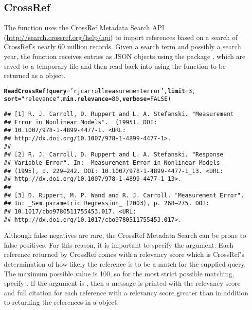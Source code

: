 \documentclass[article]{jss}\usepackage[]{graphicx}\usepackage[]{color}
\makeatletter
\newcommand{\hlnum}[1]{\textcolor[rgb]{0.125,0.125,1}{#1}}%
\newcommand{\hlstr}[1]{\textcolor[rgb]{0.125,0.125,1}{#1}}%
\newcommand{\hlstd}[1]{\textcolor[rgb]{0.251,0.251,0.282}{#1}}%
\newcommand{\hlkwc}[1]{\textcolor[rgb]{0.529,0,0.184}{\textbf{#1}}}%
\newcommand{\hlkwd}[1]{\textcolor[rgb]{0.251,0.251,0.282}{\textbf{#1}}}%
\newenvironment{kframe}{%
 \def\at@end@of@kframe{}%
 \ifinner\ifhmode%
  \def\at@end@of@kframe{\end{minipage}}%
  \begin{minipage}{\columnwidth}%
 \fi\fi%
 \def\FrameCommand##1{\hskip\@totalleftmargin \hskip-\fboxsep
 \colorbox{shadecolor}{##1}\hskip-\fboxsep
     \hskip-\linewidth \hskip-\@totalleftmargin \hskip\columnwidth}%
 \MakeFramed {\advance\hsize-\width
   \@totalleftmargin\z@ \linewidth\hsize
   \@setminipage}}%
 {\par\unskip\endMakeFramed%
 \at@end@of@kframe}
\newenvironment{knitrout}{}{} %
\makeatother
\begin{document}
\subsection{CrossRef}
The function  uses the CrossRef Metadata Search API (\url{http://search.crossref.org/help/api}) to import references based on a search of CrossRef's nearly 60 million records.  Given a search term and possibly a search year, the function receives \Bibtex{} entries as JSON objects using the  package \citep{RJSONIO}, which are saved to a temporary file and then read back into \R{} using the  function to be returned as a  object.
\begin{knitrout}
\color{fgcolor}\begin{kframe}
\begin{alltt}
\hlkwd{ReadCrossRef}\hlstd{(}\hlkwc{query} \hlstd{=} \hlstr{'rj carroll measurement error'}\hlstd{,} \hlkwc{limit} \hlstd{=} \hlnum{3}\hlstd{,}
             \hlkwc{sort} \hlstd{=} \hlstr{"relevance"}\hlstd{,} \hlkwc{min.relevance} \hlstd{=} \hlnum{80}\hlstd{,} \hlkwc{verbose} \hlstd{=} \hlnum{FALSE}\hlstd{)}
\end{alltt}
\begin{verbatim}
## [1] R. J. Carroll, D. Ruppert and L. A. Stefanski. "Measurement
## Error in Nonlinear Models".  (1995). DOI:
## 10.1007/978-1-4899-4477-1. <URL:
## http://dx.doi.org/10.1007/978-1-4899-4477-1>.
## 
## [2] R. J. Carroll, D. Ruppert and L. A. Stefanski. "Response
## Variable Error". In: _Measurement Error in Nonlinear Models_
## (1995), p. 229–242. DOI: 10.1007/978-1-4899-4477-1_13. <URL:
## http://dx.doi.org/10.1007/978-1-4899-4477-1_13>.
## 
## [3] D. Ruppert, M. P. Wand and R. J. Carroll. "Measurement Error".
## In: _Semiparametric Regression_ (2003), p. 268–275. DOI:
## 10.1017/cbo9780511755453.017. <URL:
## http://dx.doi.org/10.1017/cbo9780511755453.017>.
\end{verbatim}
\end{kframe}
\end{knitrout}


Although false negatives are rare, the CrossRef Metadata Search can be prone to false positives.  For this reason, it is important to specify the  argument.  Each reference returned by CrossRef comes with a relevancy score which is CrossRef's determination of how likely the reference is to be a match for the supplied query.  The maximum possible value is 100, so for the most strict possible matching, specify .  If the argument  is , then a message is printed with the relevancy score and full citation for each reference with a relevancy score greater than  in addition to returning the references in a  object.
\end{document}
